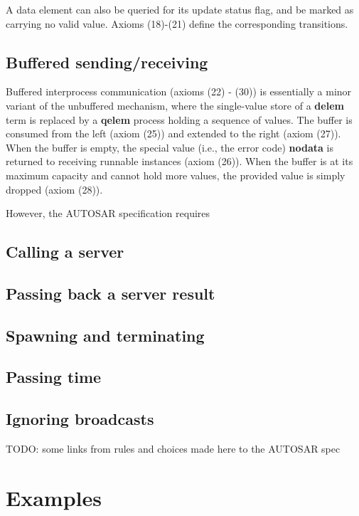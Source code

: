 \documentclass[twocolumn]{article}
\begin{document}
A data element can also be queried for its update status flag, and be marked as carrying no valid value. Axioms (18)-(21) define the corresponding transitions.


\subsection{Buffered sending/receiving}

Buffered interprocess communication (axioms (22) - (30)) is essentially a minor variant of the unbuffered mechanism, where the single-value store of a {\bf delem} term is replaced by a {\bf qelem} process holding a sequence of values. The buffer is consumed from the left (axiom (25)) and extended to the right (axiom (27)). When the buffer is empty, the special value (i.e., the error code) {\bf nodata} is returned to receiving runnable instances (axiom (26)). When the buffer is at its maximum capacity and cannot hold more values, the provided value is simply dropped (axiom (28)).

However, the AUTOSAR specification requires 


\subsection{Calling a server}

\subsection{Passing back a server result}

\subsection{Spawning and terminating} \label{sect:SpawnTerm}

\subsection{Passing time}

\subsection{Ignoring broadcasts} \label{sect:Ignore}


TODO: some links from rules and choices made here to the AUTOSAR spec

\section{Examples}
\label{sec:Examples}
\end{document}

